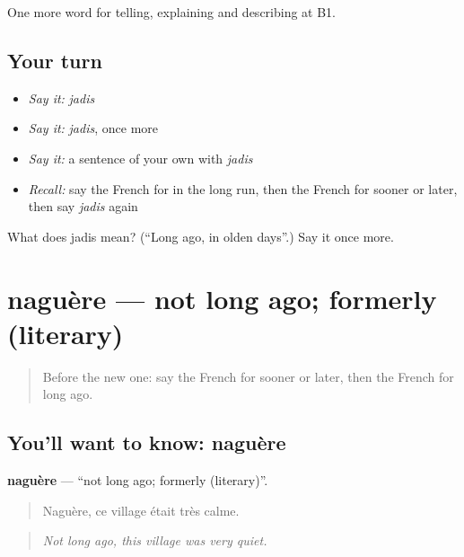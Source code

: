 \begin{grammarlens}[title={What you've built}]
One more word for telling, explaining and describing at B1.
\end{grammarlens}

\subsection*{Your turn}
\begin{itemize}
\raggedright
  \item \emph{Say it:} \emph{jadis}
  \item \emph{Say it:} \emph{jadis}, once more
  \item \emph{Say it:} a sentence of your own with \emph{jadis}
  \item \emph{Recall:} say the French for in the long run, then the French for sooner or later, then say \emph{jadis} again
\end{itemize}

\begin{tcolorbox}[breakable,colback=teal!4,colframe=teal!35!black,title={Before you move on}]
What does jadis mean? (\textquotedblleft{}Long ago, in olden days\textquotedblright{}.) Say it once more.
\end{tcolorbox}
\section[naguère]{naguère — not long ago; formerly (literary)}

\label{lesson:FR-C272-naguere}



\begin{quote}
Before the new one: say the French for sooner or later, then the French for long ago.
\end{quote}

\subsection*{You'll want to know: naguère}
\textbf{naguère} — \textquotedblleft{}not long ago; formerly (literary)\textquotedblright{}.

\begin{quote}
Naguère, ce village était très calme.
\end{quote}

\begin{quote}
\emph{Not long ago, this village was very quiet.}
\end{quote}

